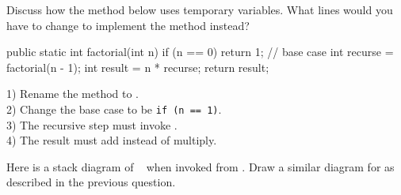 \newpage


\Q Discuss how the  method below uses temporary variables.
What lines would you have to change to implement the  method instead?

\begin{multicols}{2}

\vspace{1ex}
\begin{javalst}
public static int factorial(int n) {
    if (n == 0) {
        return 1;  // base case
    }
    int recurse = factorial(n - 1);
    int result = n * recurse;
    return result;
}
\end{javalst}

\columnbreak

\vspace*{0pt}
\begin{answer}[6em]
1) Rename the method to . \\[1ex]
2) Change the base case to be \texttt{if (n == 1)}. \\[1ex]
3) The recursive step must invoke . \\[1ex]
4) The result must add instead of multiply.
\end{answer}

\end{multicols}


\Q \label{diagram}
Here is a stack diagram of ~ when invoked from .
Draw a similar diagram for  as described in the previous question.

